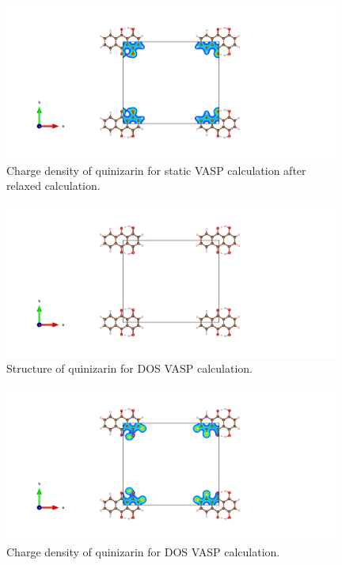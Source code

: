 \documentclass{article}
\begin{document}
  \begin{figure}[H]
      \centering
      \includegraphics[width = 11cm]{../fig/basic_staticafter_CHGCAR.png}
      \caption{Charge density of quinizarin for static VASP calculation after relaxed calculation. }
      \label{fig:basic_staticafter_CHGCAR}
  \end{figure}

  \begin{figure}[H]
      \centering
      \includegraphics[width = 11cm]{../fig/basic_DOS_CONTCAR.png}
      \caption{Structure of quinizarin for DOS VASP calculation. }
      \label{fig:basic_DOS_CONTCAR}
  \end{figure}

  \begin{figure}[H]
      \centering
      \includegraphics[width = 11cm]{../fig/basic_DOS_CHGCAR.png}
      \caption{Charge density of quinizarin for DOS VASP calculation. }
      \label{fig:basic_DOS_CHGCAR}
  \end{figure}
\end{document}
